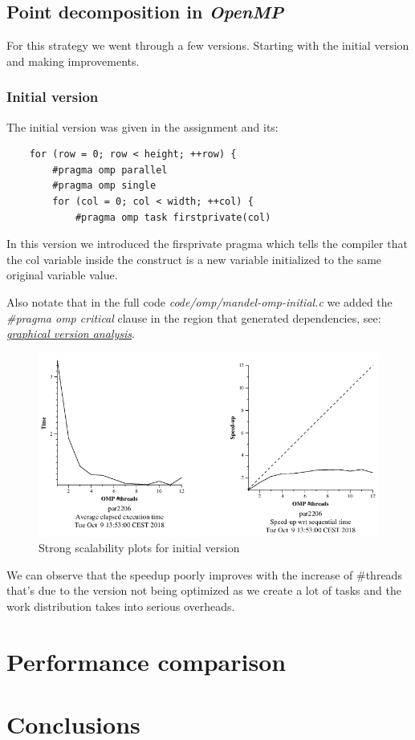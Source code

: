 \documentclass{article}
\begin{document}
\subsection{Point decomposition in \textit{OpenMP}}
For this strategy we went through a few versions. Starting with the initial version and making improvements.
\subsubsection*{Initial version}
The initial version was given in the assignment and its:
\begin{lstlisting}
    for (row = 0; row < height; ++row) {
        #pragma omp parallel
        #pragma omp single
        for (col = 0; col < width; ++col) {
            #pragma omp task firstprivate(col)

\end{lstlisting}
\begin{flushleft}
In this version we introduced the firsprivate pragma which tells the compiler that the col variable inside the construct is a new variable initialized to the same original variable value.
\end{flushleft}
\begin{flushleft}
Also notate that in the full code \textit{code/omp/mandel-omp-initial.c} we added the \textit{\#pragma omp critical} clause in the region that generated dependencies, see: \hyperref[sec:graphical]{\textit{graphical version analysis}}.
\end{flushleft}

\begin{figure}[h]
    \centering
    \includegraphics[width=1\textwidth]{strongPoint.png}
    \caption{Strong scalability plots for initial version}
    \label{fig:strongpoint}
\end{figure}
\begin{flushleft}
We can observe that the speedup poorly improves with the increase of \#threads that's due to the version not being optimized as we create a lot of tasks and the work distribution takes into serious overheads.
\end{flushleft}
\section{Performance comparison}
\section{Conclusions}
\end{document}
